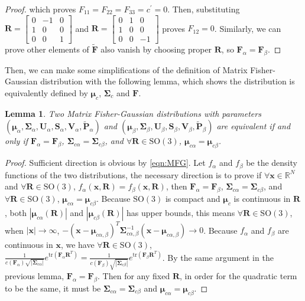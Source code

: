 \documentclass[12pt]{article}
\newtheorem{lemma}{Lemma}
\begin{document}
\begin{proof}
	which proves $F_{11}=F_{22}=F_{33}=c^\prime=0$.
	Then, substituting $\mathbf{R}=\begin{bmatrix}
	0 & -1 & 0 \\ 1 & 0 & 0 \\ 0 & 0 & 1
	\end{bmatrix}$ and $\mathbf{R}=\begin{bmatrix}
	0 & 1 & 0 \\ 1 & 0 & 0 \\ 0 & 0 & -1
	\end{bmatrix}$ proves $F_{12}=0$.
	Similarly, we can prove other elements of $\tilde{\mathbf{F}}$ also vanish by choosing proper $\mathbf{R}$, so $\mathbf{F}_\alpha=\mathbf{F}_\beta$.
\end{proof}

Then, we can make some simplifications of the definition of Matrix Fisher-Gaussian distribution with the following lemma, which shows the distribution is equivalently defined by $\bm{\mu}_c$, $\mathbf{\Sigma}_c$ and $\mathbf{F}$.
\begin{lemma}
	Two Matrix Fisher-Gaussian distributions with parameters $(\bm{\mu}_\alpha, \mathbf{\Sigma}_\alpha, \mathbf{U}_\alpha, \mathbf{S}_\alpha, \mathbf{V}_\alpha, \mathbf{\tilde{P}}_\alpha)$ and $(\bm{\mu}_\beta, \mathbf{\Sigma}_\beta, \mathbf{U}_\beta, \mathbf{S}_\beta, \mathbf{V}_\beta, \mathbf{\tilde{P}}_\beta)$ are equivalent if and only if $\mathbf{F}_\alpha=\mathbf{F}_\beta$, $\mathbf{\Sigma}_{c\alpha}=\mathbf{\Sigma}_{c\beta}$, and $\forall\mathbf{R}\in\mathrm{SO}(3)$, $\bm{\mu}_{c\alpha}=\bm{\mu}_{c\beta}$.
\end{lemma}
\begin{proof}
	Sufficient direction is obvious by \eqref{eqn:MFG}.
	Let $f_\alpha$ and $f_\beta$ be the density functions of the two distributions, the necessary direction is to prove if $\forall\bm{x}\in\mathbb{R}^N$ and $\forall\mathbf{R}\in\mathrm{SO}(3)$, $f_\alpha(\bm{x},\mathbf{R})=f_\beta(\bm{x},\mathbf{R})$, then $\mathbf{F}_\alpha=\mathbf{F}_\beta$, $\mathbf{\Sigma}_{c\alpha}=\mathbf{\Sigma}_{c\beta}$, and $\forall\mathbf{R}\in\mathrm{SO}(3)$, $\bm{\mu}_{c\alpha}=\bm{\mu}_{c\beta}$.
	Because $\mathrm{SO}(3)$ is compact and $\bm{\mu}_c$ is continuous in $\mathbf{R}$, both $|\bm{\mu}_{c\alpha}(\mathbf{R})|$ and $|\bm{\mu}_{c\beta}(\mathbf{R})|$ has upper bounds, this means $\forall\mathbf{R}\in\mathrm{SO}(3)$, when $|\bm{x}|\to\infty$, $-(\bm{x}-\bm{\mu}_{c\alpha,\beta})^T\mathbf{\Sigma}_{c\alpha,\beta}^{-1}(\bm{x}-\bm{\mu}_{c\alpha,\beta})\to 0$.
	Because $f_\alpha$ and $f_\beta$ are continuous in $\bm{x}$, we have $\forall\mathbf{R}\in\mathrm{SO}(3)$, $\frac{1}{c(\mathbf{F}_\alpha)\sqrt{|\mathbf{\Sigma}_{c\alpha}|}}e^{\mathrm{tr}(\mathbf{F}_\alpha\mathbf{R}^T)} = \frac{1}{c(\mathbf{F}_\beta)\sqrt{|\mathbf{\Sigma}_{c\beta}|}}e^{\mathrm{tr}(\mathbf{F}_\beta\mathbf{R}^T)}$.
	By the same argument in the previous lemma, $\mathbf{F}_\alpha=\mathbf{F}_\beta$.
	Then for any fixed $\mathbf{R}$, in order for the quadratic term to be the same, it must be $\mathbf{\Sigma}_{c\alpha}=\mathbf{\Sigma}_{c\beta}$ and $\bm{\mu}_{c\alpha}=\bm{\mu}_{c\beta}$.
\end{proof}
\end{document}
